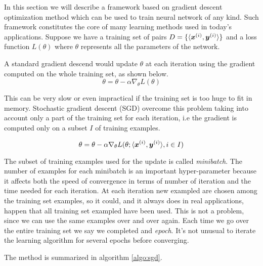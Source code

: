 In this section we will describe a framework based on gradient descent optimization method which can be used to train 
neural network of any kind. Such framework constitutes the core of many learning methods used in today's applications. 
Suppose we have a training set of pairs $D=\{\langle\boldsymbol{x}^{(i)},\boldsymbol{y}^{(i)}\rangle\}$ and a loss function $L(\theta)$ 
where $\theta$ represents all the parameters of the network.

A standard gradient descend would update $\theta$ at each iteration using the gradient computed on the whole training 
set, as shown below.
\begin{equation}
 \theta = \theta - \alpha \nabla_\theta L(\theta)
\end{equation}

This can be very slow or even impractical if the training set is too huge to fit in memory. Stochastic gradient descent (SGD)
overcome this problem taking into account only a part of the training set for each iteration, i.e the gradient is 
computed only on a subset $I$ of training examples. 

\begin{equation}
 \theta = \theta - \alpha \nabla_\theta L(\theta; \langle\boldsymbol{x}^{(i)},\boldsymbol{y}^{(i)}\rangle, i\in I)
 \label{eq:updateRule}
\end{equation}

The subset of training examples used for the update is called \textit{minibatch}. The number of examples for each 
minibatch is an important hyper-parameter because it affects both the speed of convergence in terms of number of 
iteration and the time needed for each iteration. At each iteration new exampled are chosen among the training set 
examples, so it could, and it always does in real applications, happen that all training set exampled have been used.
This is not a problem, since we can use the same examples over and over again. Each time we go over the entire training 
set we say we completed and \textit{epoch}. It's not unusual to iterate the learning algorithm for several epochs 
before converging.

The method is summarized in algorithm \ref{algo:sgd}.

